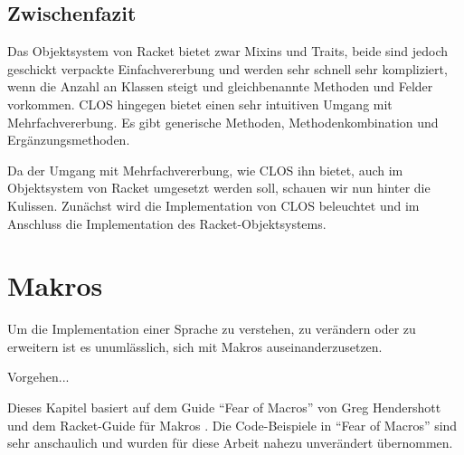 
\pagestyle{diplHeadings}





\setcounter{page}{1}
\tableofcontents
\cleardoublepage 

\setcounter{page}{1} 
\mainmatter  
{}





\section{Zwischenfazit}
Das Objektsystem von Racket bietet zwar Mixins und Traits, beide sind jedoch geschickt verpackte Einfachvererbung und werden sehr schnell sehr kompliziert, wenn die Anzahl an Klassen steigt und gleichbenannte Methoden und Felder vorkommen. CLOS hingegen bietet einen sehr intuitiven Umgang mit Mehrfachvererbung. Es gibt generische Methoden, Methodenkombination und Ergänzungsmethoden.

Da der Umgang mit Mehrfachvererbung, wie CLOS ihn bietet, auch im Objektsystem von Racket umgesetzt werden soll, schauen wir nun hinter die Kulissen. Zunächst wird die Implementation von CLOS beleuchtet und im Anschluss die Implementation des Racket-Objektsystems.




\chapter{Makros} 
\label{makros}
Um die Implementation einer Sprache zu verstehen, zu verändern oder zu erweitern ist es unumlässlich, sich mit Makros auseinanderzusetzen. 

Vorgehen... %

Dieses Kapitel basiert auf dem Guide ``Fear of Macros'' von Greg Hendershott \cite{fearofmacros} und dem Racket-Guide für Makros \cite{racketguide-macros}. Die Code-Beispiele in ``Fear of Macros'' sind sehr anschaulich und wurden für diese Arbeit nahezu unverändert übernommen.


